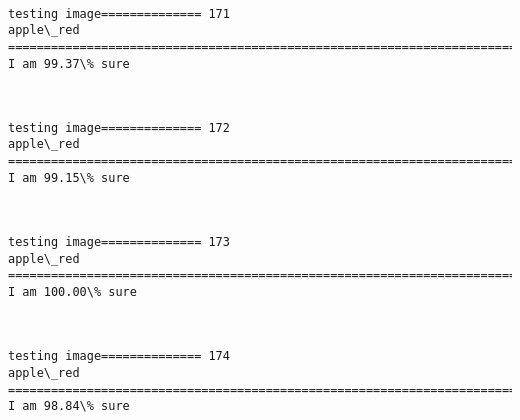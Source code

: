 \documentclass[11pt]{article}
\begin{document}
    \begin{center}
    \end{center}
    { \hspace*{\fill} \\}
    
    \begin{Verbatim}[commandchars=\\\{\}]
testing image============== 171
apple\_red
============================================================================
I am 99.37\% sure

    \end{Verbatim}

    \begin{center}
    \end{center}
    { \hspace*{\fill} \\}
    
    \begin{Verbatim}[commandchars=\\\{\}]
testing image============== 172
apple\_red
============================================================================
I am 99.15\% sure

    \end{Verbatim}

    \begin{center}
    \end{center}
    { \hspace*{\fill} \\}
    
    \begin{Verbatim}[commandchars=\\\{\}]
testing image============== 173
apple\_red
============================================================================
I am 100.00\% sure

    \end{Verbatim}

    \begin{center}
    \end{center}
    { \hspace*{\fill} \\}
    
    \begin{Verbatim}[commandchars=\\\{\}]
testing image============== 174
apple\_red
============================================================================
I am 98.84\% sure

    \end{Verbatim}
\end{document}
